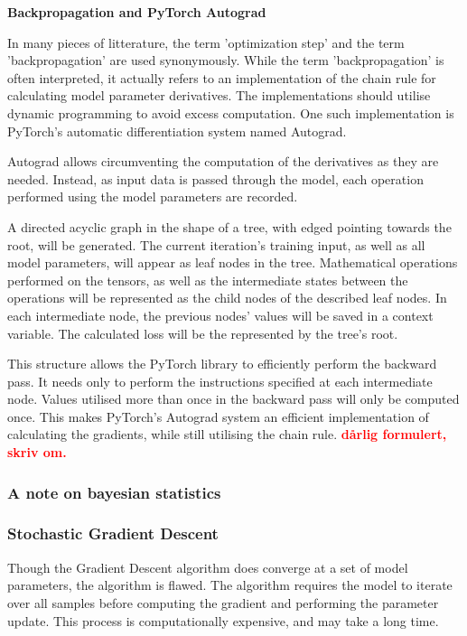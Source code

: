 \textbf{Backpropagation and PyTorch Autograd}

In many pieces of litterature, the term 'optimization step' and the term 'backpropagation'
are used synonymously. While the term 'backpropagation' is often interpreted, it actually
refers to an implementation of the chain rule for calculating model parameter derivatives.
The implementations should utilise dynamic programming to avoid excess computation.
One such implementation is PyTorch's automatic differentiation system named Autograd.

Autograd allows circumventing the computation of the derivatives as they are needed.
Instead, as input data is passed through the model, 
each operation performed using the model parameters are recorded.

A directed acyclic graph in the shape of a tree, with edged pointing towards the root, 
will be generated. 
The current iteration's training input, as well as all model parameters, 
will appear as leaf nodes in the tree.
Mathematical operations performed on the tensors, 
as well as the intermediate states between the operations will be represented as the child nodes of the described leaf nodes.
In each intermediate node, the previous nodes' values will be saved in a context variable.
The calculated loss will be the represented by the tree's root.

This structure allows the PyTorch library to efficiently perform the backward pass.
It needs only to perform the instructions specified at each intermediate node.
Values utilised more than once in the backward pass will only be computed once.
This makes PyTorch's Autograd system an efficient implementation of calculating the gradients,
while still utilising the chain rule. \textbf{\textcolor{red}{dårlig formulert, skriv om.}}





\subsubsection{A note on bayesian statistics}

\subsubsection{Stochastic Gradient Descent}

Though the Gradient Descent algorithm does converge at a set of model parameters, the algorithm is flawed.
The algorithm requires the model to iterate over all samples before computing the gradient and performing the parameter update.
This process is computationally expensive, and may take a long time. 

